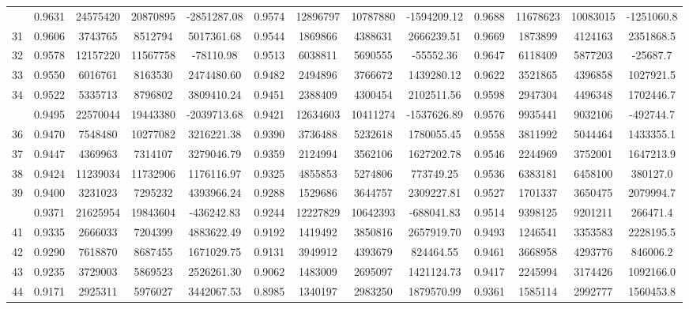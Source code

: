 \documentclass[
  12pt,
]{article}
\begin{document}
\begin{longtable}[t]{lcccccccccccc}
\addlinespace
30 & 0.9631 & 24575420 & 20870895 & -2851287.08 & 0.9574 & 12896797 & 10787880 & -1594209.12 & 0.9688 & 11678623 & 10083015 & -1251060.8\\
31 & 0.9606 & 3743765 & 8512794 & 5017361.68 & 0.9544 & 1869866 & 4388631 & 2666239.51 & 0.9669 & 1873899 & 4124163 & 2351868.5\\
32 & 0.9578 & 12157220 & 11567758 & -78110.98 & 0.9513 & 6038811 & 5690555 & -55552.36 & 0.9647 & 6118409 & 5877203 & -25687.7\\
33 & 0.9550 & 6016761 & 8163530 & 2474480.60 & 0.9482 & 2494896 & 3766672 & 1439280.12 & 0.9622 & 3521865 & 4396858 & 1027921.5\\
34 & 0.9522 & 5335713 & 8796802 & 3809410.24 & 0.9451 & 2388409 & 4300454 & 2102511.56 & 0.9598 & 2947304 & 4496348 & 1702446.7\\
\addlinespace
35 & 0.9495 & 22570044 & 19443380 & -2039713.68 & 0.9421 & 12634603 & 10411274 & -1537626.89 & 0.9576 & 9935441 & 9032106 & -492744.7\\
36 & 0.9470 & 7548480 & 10277082 & 3216221.38 & 0.9390 & 3736488 & 5232618 & 1780055.45 & 0.9558 & 3811992 & 5044464 & 1433355.1\\
37 & 0.9447 & 4369963 & 7314107 & 3279046.79 & 0.9359 & 2124994 & 3562106 & 1627202.78 & 0.9546 & 2244969 & 3752001 & 1647213.9\\
38 & 0.9424 & 11239034 & 11732906 & 1176116.97 & 0.9325 & 4855853 & 5274806 & 773749.25 & 0.9536 & 6383181 & 6458100 & 380127.0\\
39 & 0.9400 & 3231023 & 7295232 & 4393966.24 & 0.9288 & 1529686 & 3644757 & 2309227.81 & 0.9527 & 1701337 & 3650475 & 2079994.7\\
\addlinespace
40 & 0.9371 & 21625954 & 19843604 & -436242.83 & 0.9244 & 12227829 & 10642393 & -688041.83 & 0.9514 & 9398125 & 9201211 & 266471.4\\
41 & 0.9335 & 2666033 & 7204399 & 4883622.49 & 0.9192 & 1419492 & 3850816 & 2657919.70 & 0.9493 & 1246541 & 3353583 & 2228195.5\\
42 & 0.9290 & 7618870 & 8687455 & 1671029.75 & 0.9131 & 3949912 & 4393679 & 824464.55 & 0.9461 & 3668958 & 4293776 & 846006.2\\
43 & 0.9235 & 3729003 & 5869523 & 2526261.30 & 0.9062 & 1483009 & 2695097 & 1421124.73 & 0.9417 & 2245994 & 3174426 & 1092166.0\\
44 & 0.9171 & 2925311 & 5976027 & 3442067.53 & 0.8985 & 1340197 & 2983250 & 1879570.99 & 0.9361 & 1585114 & 2992777 & 1560453.8\\

\end{longtable}
\end{document}
